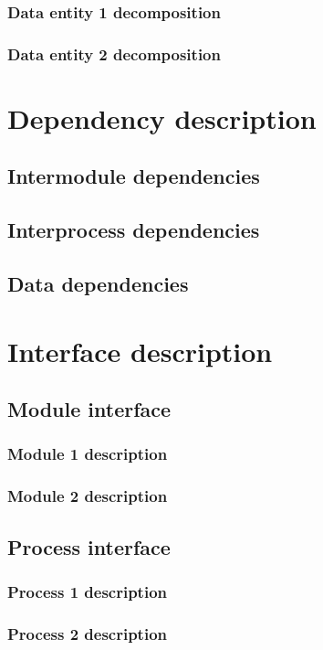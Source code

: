 \documentclass[12pt]{article}
\begin{document}
\subsubsection{Data entity 1 decomposition}
\subsubsection{Data entity 2 decomposition}

\section{Dependency description}
\subsection{Intermodule dependencies}
\subsection{Interprocess dependencies}
\subsection{Data dependencies}

\section{Interface description}
\subsection{Module interface}
\subsubsection{Module 1 description}
\subsubsection{Module 2 description}
\subsection{Process interface}
\subsubsection{Process 1 description}
\subsubsection{Process 2 description}
\end{document}
